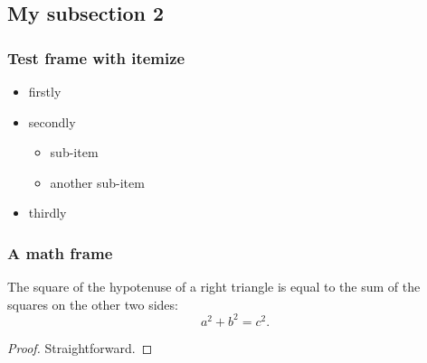 \documentclass[pdflatex,compress,mathserif]{beamer}
\begin{document}

\subsection{My subsection 2}
\begin{frame}
\frametitle{Test frame with itemize}

\begin{itemize}
    \item<1-> firstly
    \item<2-> secondly
        \begin{itemize}
            \item sub-item
            \item another sub-item
        \end{itemize}
      \item<3-> thirdly
\end{itemize}

\end{frame}


\begin{frame}
\frametitle{A math frame}

\begin{theorem}[Pythagoras]
The square of the hypotenuse of a \alert{right} triangle is equal to the sum of the squares on the other two sides:
\[
a^2 + b^2 = c^2.
\]
\end{theorem}
\begin{proof}
Straightforward.
\end{proof}

\end{frame}
\end{document}
